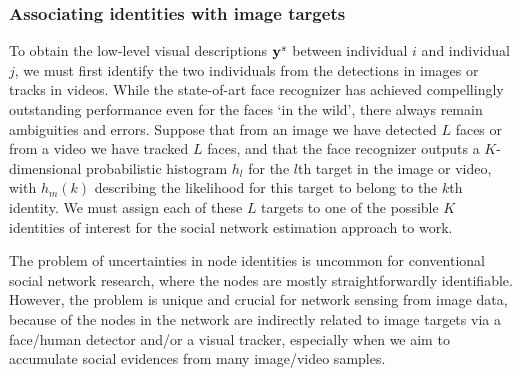 






\subsubsection{Associating identities with image targets}
\label{sec:assoc}

To obtain the low-level visual descriptions ${\bf y}^s$ between individual $i$ and individual $j$, we must first identify the two individuals from the detections in images or tracks in videos. While the state-of-art face recognizer has achieved compellingly outstanding performance even for the faces `in the wild', there always remain ambiguities and errors. Suppose that from an image we have detected $L$ faces or from a video we have tracked $L$ faces, and that the face recognizer outputs a $K$-dimensional probabilistic histogram $h_l$ for the $l$th target in the image or video, with $h_m(k)$ describing the likelihood for this target to belong to the $k$th identity. We must assign each of these $L$ targets to one of the possible $K$ identities of interest for the social network estimation approach to work. 

The problem of uncertainties in node identities is uncommon for conventional social network research, where the nodes are mostly straightforwardly identifiable. However, the problem is unique and crucial for network sensing from image data, because of the nodes in the network are indirectly related to image targets via a face/human detector and/or a visual tracker, especially when we aim to accumulate social evidences from many image/video samples.

